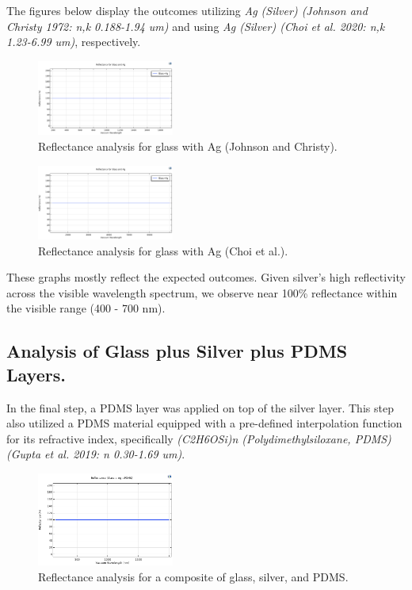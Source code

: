 The figures below display the outcomes utilizing \emph{Ag (Silver) (Johnson and Christy 1972: n,k 0.188-1.94 um)} and using \emph{Ag (Silver) (Choi et al. 2020: n,k 1.23-6.99 um)}, respectively.

\begin{figure}[ht!]
  \centering
  \includegraphics[width=0.4\textwidth]{Chapters/Figures/Chapter 4 Figures/Reflectance for glass and Ag (Johnson and Christy).png}
  \caption{Reflectance analysis for glass with Ag (Johnson and Christy).}
  \label{fig:Reflectance analysis for glass with Ag (Johnson and Christy)}
\end{figure}

\begin{figure}[ht!]
  \centering
  \includegraphics[width=0.4\textwidth]{Chapters/Figures/Chapter 4 Figures/Reflectance for glass and Ag for Choi et al.png}
  \caption{Reflectance analysis for glass with Ag (Choi et al.).}
  \label{fig:Reflectance analysis for glass with Ag (Choi et al)}
\end{figure}

These graphs mostly reflect the expected outcomes. Given silver's high reflectivity across the visible wavelength spectrum, we observe near 100\% reflectance within the visible range (400 - 700 nm).

\subsection{Analysis of Glass plus Silver plus PDMS Layers.}
In the final step, a PDMS layer was applied on top of the silver layer. This step also utilized a PDMS material equipped with a pre-defined interpolation function for its refractive index, specifically \emph{(C2H6OSi)n (Polydimethylsiloxane, PDMS) (Gupta et al. 2019: n 0.30-1.69 um)}.

\begin{figure}[ht!]
  \centering
  \includegraphics[width=0.4\textwidth]{Chapters/Figures/Chapter 4 Figures/Reflectance Results (Glass + Ag + PDMS).png}
  \caption{Reflectance analysis for a composite of glass, silver, and PDMS.}
  \label{fig:Reflectance analysis for glass, silver, and PDMS}
\end{figure}

